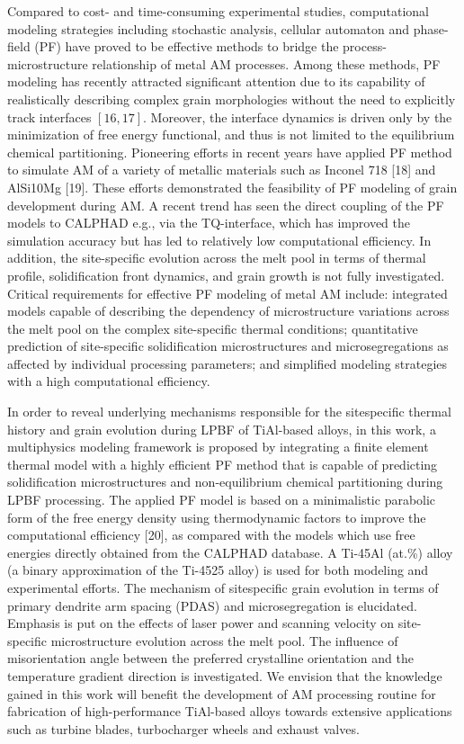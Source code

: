 \documentclass[10pt]{article}
\begin{document}
Compared to cost- and time-consuming experimental studies, computational modeling strategies including stochastic analysis, cellular automaton and phase-field (PF) have proved to be effective methods to bridge the process-microstructure relationship of metal AM processes. Among these methods, PF modeling has recently attracted significant attention due to its capability of realistically describing complex grain morphologies without the need to explicitly track interfaces $[16,17]$. Moreover, the interface dynamics is driven only by the minimization of free energy functional, and thus is not limited to the equilibrium chemical partitioning. Pioneering efforts in recent years have applied PF method to simulate AM of a variety of metallic materials such as Inconel 718 [18] and AlSi10Mg [19]. These efforts demonstrated the feasibility of PF modeling of grain development during AM. A recent trend has seen the direct coupling of the PF models to CALPHAD e.g., via the TQ-interface, which has improved the simulation accuracy but has led to relatively low computational efficiency. In addition, the site-specific evolution across the melt pool in terms of thermal profile, solidification front dynamics, and grain growth is not fully investigated. Critical requirements for effective PF modeling of metal AM include: integrated models capable of describing the dependency of microstructure variations across the melt pool on the complex site-specific thermal conditions; quantitative prediction of site-specific solidification microstructures and microsegregations as affected by individual processing parameters; and simplified modeling strategies with a high computational efficiency.

In order to reveal underlying mechanisms responsible for the sitespecific thermal history and grain evolution during LPBF of TiAl-based alloys, in this work, a multiphysics modeling framework is proposed by integrating a finite element thermal model with a highly efficient PF method that is capable of predicting solidification microstructures and non-equilibrium chemical partitioning during LPBF processing. The applied PF model is based on a minimalistic parabolic form of the free energy density using thermodynamic factors to improve the computational efficiency [20], as compared with the models which use free energies directly obtained from the CALPHAD database. A Ti-45Al (at.\%) alloy (a binary approximation of the Ti-4525 alloy) is used for both modeling and experimental efforts. The mechanism of sitespecific grain evolution in terms of primary dendrite arm spacing (PDAS) and microsegregation is elucidated. Emphasis is put on the effects of laser power and scanning velocity on site-specific microstructure evolution across the melt pool. The influence of misorientation angle between the preferred crystalline orientation and the temperature gradient direction is investigated. We envision that the knowledge gained in this work will benefit the development of AM processing routine for fabrication of high-performance TiAl-based alloys towards extensive applications such as turbine blades, turbocharger wheels and exhaust valves.
\end{document}

